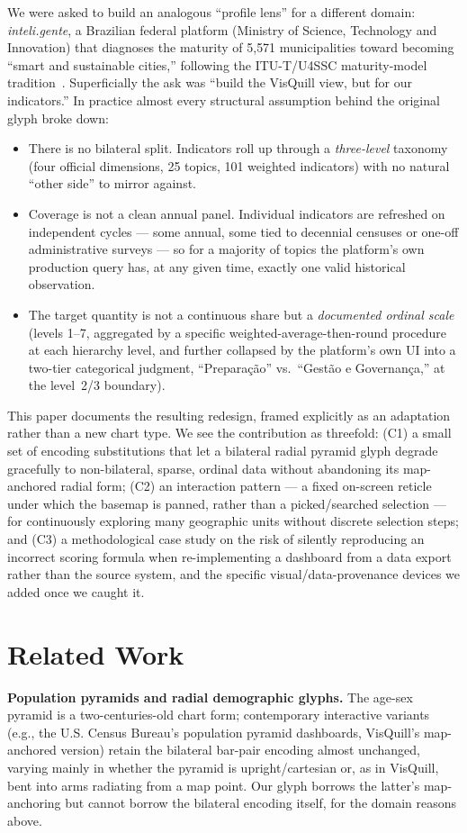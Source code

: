 \documentclass[10pt,twocolumn]{article}
\begin{document}
We were asked to build an analogous ``profile lens'' for a different domain: \emph{inteli.gente}, a Brazilian federal platform (Ministry of Science, Technology and Innovation) that diagnoses the maturity of 5{,}571 municipalities toward becoming ``smart and sustainable cities,'' following the ITU-T/U4SSC maturity-model tradition~\cite{itu-y4903,u4ssc}. Superficially the ask was ``build the VisQuill view, but for our indicators.'' In practice almost every structural assumption behind the original glyph broke down:

\begin{itemize}
\item There is no bilateral split. Indicators roll up through a \emph{three-level} taxonomy (four official dimensions, 25 topics, 101 weighted indicators) with no natural ``other side'' to mirror against.
\item Coverage is not a clean annual panel. Individual indicators are refreshed on independent cycles — some annual, some tied to decennial censuses or one-off administrative surveys — so for a majority of topics the platform's own production query has, at any given time, exactly one valid historical observation.
\item The target quantity is not a continuous share but a \emph{documented ordinal scale} (levels 1--7, aggregated by a specific weighted-average-then-round procedure at each hierarchy level, and further collapsed by the platform's own UI into a two-tier categorical judgment, ``Prepara\c{c}\~ao'' vs.\ ``Gest\~ao e Governan\c{c}a,'' at the level~2/3 boundary).
\end{itemize}

This paper documents the resulting redesign, framed explicitly as an adaptation rather than a new chart type. We see the contribution as threefold: (C1) a small set of encoding substitutions that let a bilateral radial pyramid glyph degrade gracefully to non-bilateral, sparse, ordinal data without abandoning its map-anchored radial form; (C2) an interaction pattern — a fixed on-screen reticle under which the basemap is panned, rather than a picked/searched selection — for continuously exploring many geographic units without discrete selection steps; and (C3) a methodological case study on the risk of silently reproducing an incorrect scoring formula when re-implementing a dashboard from a data export rather than the source system, and the specific visual/data-provenance devices we added once we caught it.

\section{Related Work}
\textbf{Population pyramids and radial demographic glyphs.} The age-sex pyramid is a two-centuries-old chart form; contemporary interactive variants (e.g., the U.S. Census Bureau's population pyramid dashboards, VisQuill's map-anchored version) retain the bilateral bar-pair encoding almost unchanged, varying mainly in whether the pyramid is upright/cartesian or, as in VisQuill, bent into arms radiating from a map point. Our glyph borrows the latter's map-anchoring but cannot borrow the bilateral encoding itself, for the domain reasons above.
\end{document}
